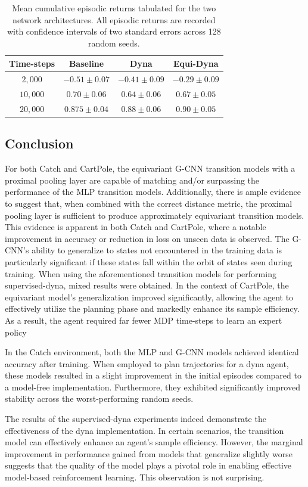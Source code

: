 \begin{table}
	\centering
	\begin{tabular}{|c|c|c|c|}
		\hline
		Time-steps & Baseline         & Dyna             & Equi-Dyna                 \\
		\hline
		$2, 000$   & $- 0.51\pm 0.07$ & $-0.41 \pm 0.09$ & $\mathbf{-0.29\pm 0.09}$  \\
		$10, 000$  & $0.70 \pm 0.06$  & $0.64\pm 0.06 $  & $\mathbf{0.67 \pm 0.05} $ \\
		$20,000$   & $0.875 \pm 0.04$ & $0.88\pm 0.06$   & $\mathbf{0.90\pm 0.05}$   \\
		\hline
	\end{tabular}
	\caption{Mean cumulative episodic returns tabulated for the two network architectures. All episodic returns are recorded with confidence intervals of two standard errors across 128 random seeds.}
	\label{tab:supervised-dyna-catch}
\end{table}

\subsection{Conclusion}
For both Catch and CartPole, the equivariant G-CNN transition models with a proximal pooling layer are capable of matching and/or surpassing the performance of the MLP transition models. Additionally, there is ample evidence to suggest that, when combined with the correct distance metric, the proximal pooling layer is sufficient to produce approximately equivariant transition models. This evidence is apparent in both Catch and CartPole, where a notable improvement in accuracy or reduction in loss on unseen data is observed. The G-CNN's ability to generalize to states not encountered in the training data is particularly significant if these states fall within the orbit of states seen during training.
When using the aforementioned transition models for performing supervised-dyna, mixed results were obtained. In the context of CartPole, the equivariant model's generalization improved significantly, allowing the agent to effectively utilize the planning phase and markedly enhance its sample efficiency. As a result, the agent required far fewer MDP time-steps to learn an expert policy

In the Catch environment, both the MLP and G-CNN models achieved identical accuracy after training. When employed to plan trajectories for a dyna agent, these models resulted in a slight improvement in the initial episodes compared to a model-free implementation. Furthermore, they exhibited significantly improved stability across the worst-performing random seeds.

The results of the supervised-dyna experiments indeed demonstrate the effectiveness of the dyna implementation. In certain scenarios, the transition model can effectively enhance an agent's sample efficiency. However, the marginal improvement in performance gained from models that generalize slightly worse suggests that the quality of the model plays a pivotal role in enabling effective model-based reinforcement learning. This observation is not surprising.

